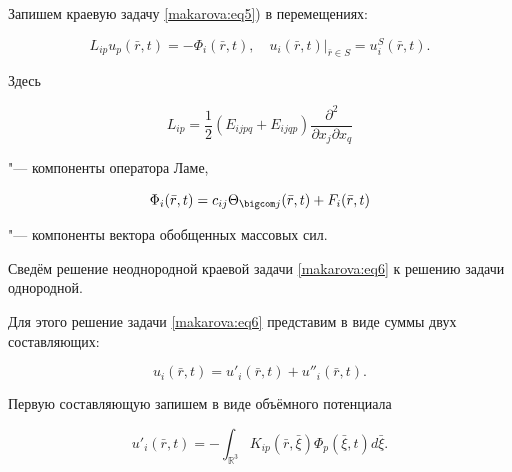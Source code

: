 Запишем краевую задачу \eqref{makarova:eq5}) в перемещениях:

\begin{equation}

\label{makarova:eq6}

L_{ip} u_p (\bar {r} , t)=-\Phi_i (\bar {r} , t), \quad 

u_i (\bar {r} , t)\big|_{\bar {r}\in S}=u_i^S (\bar {r} , t).

\end{equation}

Здесь 

\begin{equation}

\label{makarova:eq7}

L_{ip}=\frac{1}{2}\left(E_{ijpq}+E_{ijqp} \right)\frac{\partial^2}{\partial x_j \partial x_q}

\end{equation}

"--- компоненты оператора Ламе,

\begin{equation}

\label{makarova:eq8}

\Phi _i (\bar {r} , t)=c_{ij} \Theta_{\bigcom j}

(\bar {r} , t)+F_i (\bar {r} , t)

\end{equation}

"--- компоненты вектора обобщенных массовых сил.



Сведём решение неоднородной краевой задачи \eqref{makarova:eq6} к решению задачи однородной.

Для этого решение задачи \eqref{makarova:eq6} представим в виде суммы двух составляющих:

\begin{equation}

\label{makarova:eq9}

u_i (\bar {r} , t)={u}'_i (\bar{r} , t)+{u}''_i (\bar {r} , t).

\end{equation}

Первую составляющую запишем в виде объёмного потенциала

\begin{equation}

\label{makarova:eq10}

u'_i (\bar {r} , t)=-\int_{\mathbb R^3} K_{ip} (\bar {r} , \bar {\xi})\Phi_p (\bar {\xi} , t)d\bar

{\xi}.

\end{equation}

